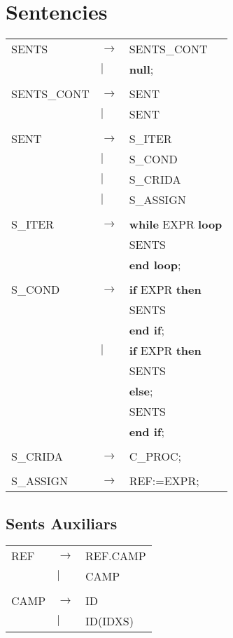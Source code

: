 \documentclass{article}
\begin{document}
	\section{Sentencies}
	\begin{tabular}{l l l}
		SENTS&$\to$&SENTS\_CONT\\
		&$|$&\textbf{null};\\
		\\
		SENTS\_CONT&$\to$&SENT\\
		&$|$&SENT\\
		\\
		SENT&$\to$&S\_ITER\\
		&$|$&S\_COND\\
		&$|$&S\_CRIDA\\
		&$|$&S\_ASSIGN\\
		\\
		S\_ITER&$\to$&\textbf{while} EXPR \textbf{loop}\\
		&&\hspace*{5mm}SENTS\\
		&&\textbf{end loop};\\
		\\
		S\_COND&$\to$&\textbf{if} EXPR \textbf{then}\\
		&&\hspace*{5mm}SENTS\\
		&&\textbf{end if};\\
		&$|$&\textbf{if} EXPR \textbf{then}\\
		&&\hspace*{5mm}SENTS\\
		&&\textbf{else};\\
		&&\hspace*{5mm}SENTS\\
		&&\textbf{end if};\\
		\\
		S\_CRIDA&$\to$&C\_PROC;\\
		\\
		S\_ASSIGN&$\to$&REF:=EXPR;
	\end{tabular}
	\subsection{Sents Auxiliars}
	\begin{tabular}{l l l}
		REF&$\to$&REF.CAMP\\
		&$|$&CAMP\\
		\\
		CAMP&$\to$&ID\\
		&$|$&ID(IDXS)
	\end{tabular}
\end{document}
